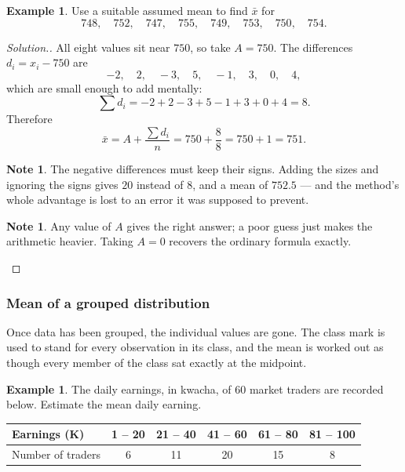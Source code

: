 \documentclass[11pt,a4paper]{article}
\theoremstyle{definition}
\newtheorem{example}[thm]{Example}
\newtheorem{note}[thm]{Note}
\newenvironment{solution}
  {\renewcommand{\qedsymbol}{}\begin{proof}[\textit{Solution}.]}
  {\end{proof}}
\begin{document}
\begin{example}
Use a suitable assumed mean to find $\bar{x}$ for
$$748,\quad 752,\quad 747,\quad 755,\quad 749,\quad 753,\quad 750,\quad 754.$$
\end{example}

\begin{solution}
All eight values sit near $750$, so take $A=750$. The differences $d_i=x_i-750$ are
$$-2,\quad 2,\quad -3,\quad 5,\quad -1,\quad 3,\quad 0,\quad 4,$$
which are small enough to add mentally:
$$\sum d_i=-2+2-3+5-1+3+0+4=8.$$
Therefore
$$\bar{x}=A+\frac{\sum d_i}{n}=750+\frac{8}{8}=750+1=751.$$

\begin{note}
The negative differences must keep their signs. Adding the sizes and ignoring the signs
gives $20$ instead of $8$, and a mean of $752.5$ --- and the method's whole advantage is
lost to an error it was supposed to prevent.
\end{note}

\begin{note}
Any value of $A$ gives the right answer; a poor guess just makes the arithmetic
heavier. Taking $A=0$ recovers the ordinary formula exactly.
\end{note}
\end{solution}

\subsubsection{Mean of a grouped distribution}

Once data has been grouped, the individual values are gone. The class mark is used to
stand for every observation in its class, and the mean is worked out as though every
member of the class sat exactly at the midpoint.

\begin{example}
The daily earnings, in kwacha, of $60$ market traders are recorded below. Estimate the
mean daily earning.

\begin{table}[H]
\centering
\begin{tabular}{|l|c|c|c|c|c|}
\hline
Earnings (K) & 1 -- 20 & 21 -- 40 & 41 -- 60 & 61 -- 80 & 81 -- 100\\
\hline
Number of traders & 6 & 11 & 20 & 15 & 8\\
\hline
\end{tabular}
\end{table}
\end{example}
\end{document}
